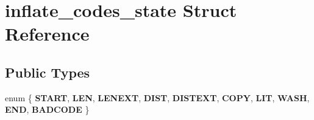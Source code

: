 \hypertarget{structinflate__codes__state}{}\section{inflate\+\_\+codes\+\_\+state Struct Reference}
\label{structinflate__codes__state}
\subsection*{Public Types}
\begin{DoxyCompactItemize}
\item 
\mbox{\label{structinflate__codes__state_a42143f1051f7146ed4bc375aa12fa71f}} 
enum \{ \newline
{\bfseries S\+T\+A\+RT}, 
{\bfseries L\+EN}, 
{\bfseries L\+E\+N\+E\+XT}, 
{\bfseries D\+I\+ST}, 
\newline
{\bfseries D\+I\+S\+T\+E\+XT}, 
{\bfseries C\+O\+PY}, 
{\bfseries L\+IT}, 
{\bfseries W\+A\+SH}, 
\newline
{\bfseries E\+ND}, 
{\bfseries B\+A\+D\+C\+O\+DE}
 \}
\end{DoxyCompactItemize}
